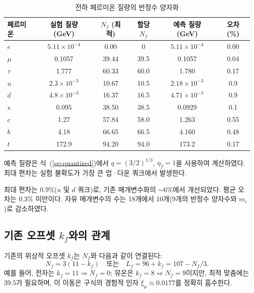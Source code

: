 \documentclass[12pt,a4paper]{article}
\begin{document}
	\begin{table}[htbp]
		\centering
		\caption{전하 페르미온 질량의 반정수 양자화}
		\label{tab:masses}
		\begin{tabular}{l c c c c c}
			\toprule
			페르미온 & 실험 질량 (GeV) & \(N_f\) (최적) & 할당 \(N_f\) & 예측 질량 (GeV) & 오차 (\%) \\
			\midrule
			\(e\)   & \(5.11\times10^{-4}\) & 0.00  & 0      & \(5.11\times10^{-4}\) & 0.00 \\
			\(\mu\)  & 0.1057                & 39.44 & 39.5   & 0.1057               & 0.04 \\
			\(\tau\) & 1.777                 & 60.33 & 60.0   & 1.780                & 0.17 \\
			\(u\)   & \(2.3\times10^{-3}\)    & 10.67 & 10.5   & \(2.18\times10^{-3}\)  & 0.9 \\
			\(d\)   & \(4.8\times10^{-3}\)    & 16.37 & 16.5   & \(4.71\times10^{-3}\)  & 0.9 \\
			\(s\)   & 0.095                 & 38.50 & 38.5   & 0.0929               & 0.1 \\
			\(c\)   & 1.27                  & 57.84 & 58.0   & 1.263                & 0.55 \\
			\(b\)   & 4.18                  & 66.65 & 66.5   & 4.160                & 0.48 \\
			\(t\)   & 172.9                 & 94.20 & 94.0   & 173.2                & 0.17 \\
			\bottomrule
		\end{tabular}
		\par\smallskip
		\footnotesize 예측 질량은 식~(\ref{eq:quantized})에서 \(q = (3/2)^{1/3}\), \(\eta_f = 1\)을 사용하여 계산하였다. 최대 편차는 실험 불확도가 가장 큰 업·다운 쿼크에서 발생한다.
	\end{table}
	
	최대 편차는 \(0.9\%\)(\(u\) 및 \(d\) 쿼크)로, 기존 매개변수화의 \(\sim 6\%\)에서 개선되었다. 평균 오차는 \(0.3\%\) 미만이다. 자유 매개변수의 수는 18개에서 10개(9개의 반정수 양자수와 \(m_e\))로 감소하였다.
	
	\subsection{기존 오프셋 \(k_f\)와의 관계}
	
	기존의 위상적 오프셋 \(k_f\)는 \(N_f\)와 다음과 같이 연결된다:
	\begin{equation}
		N_f = 3(11 - k_f) \quad \text{또는} \quad L_f = 96 + k_f = 107 - N_f/3.
	\end{equation}
	예를 들어, 전자는 \(k_f = 11 \Rightarrow N_f = 0\); 뮤온은 \(k_f = 8 \Rightarrow N_f = 9\)이지만, 최적 맞춤에는 \(39.5\)가 필요하며, 이 이동은 구식의 경험적 인자 \(\xi_\mu \approx 0.0177\)를 정확히 흡수한다.
	
\end{document}

